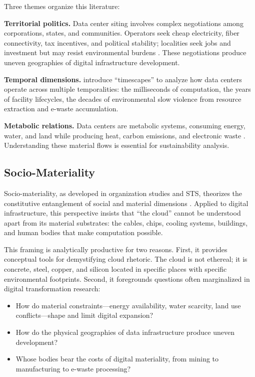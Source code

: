 \documentclass[review]{elsarticle}
\begin{document}
Three themes organize this literature:

\textbf{Territorial politics.} Data center siting involves complex negotiations among corporations, states, and communities. Operators seek cheap electricity, fiber connectivity, tax incentives, and political stability; localities seek jobs and investment but may resist environmental burdens \citep{Johnson2019, Pickren2018}. These negotiations produce uneven geographies of digital infrastructure development.

\textbf{Temporal dimensions.} \citet{Velkova2023} introduce ``timescapes'' to analyze how data centers operate across multiple temporalities: the milliseconds of computation, the years of facility lifecycles, the decades of environmental slow violence from resource extraction and e-waste accumulation.

\textbf{Metabolic relations.} Data centers are metabolic systems, consuming energy, water, and land while producing heat, carbon emissions, and electronic waste \citep{Carruth2014, Monstadt2025}. Understanding these material flows is essential for sustainability analysis.

\subsection{Socio-Materiality}

Socio-materiality, as developed in organization studies and STS, theorizes the constitutive entanglement of social and material dimensions \citep{Orlikowski2007}. Applied to digital infrastructure, this perspective insists that ``the cloud'' cannot be understood apart from its material substrates: the cables, chips, cooling systems, buildings, and human bodies that make computation possible.

This framing is analytically productive for two reasons. First, it provides conceptual tools for demystifying cloud rhetoric. The cloud is not ethereal; it is concrete, steel, copper, and silicon located in specific places with specific environmental footprints. Second, it foregrounds questions often marginalized in digital transformation research:

\begin{itemize}
    \item How do material constraints---energy availability, water scarcity, land use conflicts---shape and limit digital expansion?
    \item How do the physical geographies of data infrastructure produce uneven development?
    \item Whose bodies bear the costs of digital materiality, from mining to manufacturing to e-waste processing?
\end{itemize}
\end{document}
